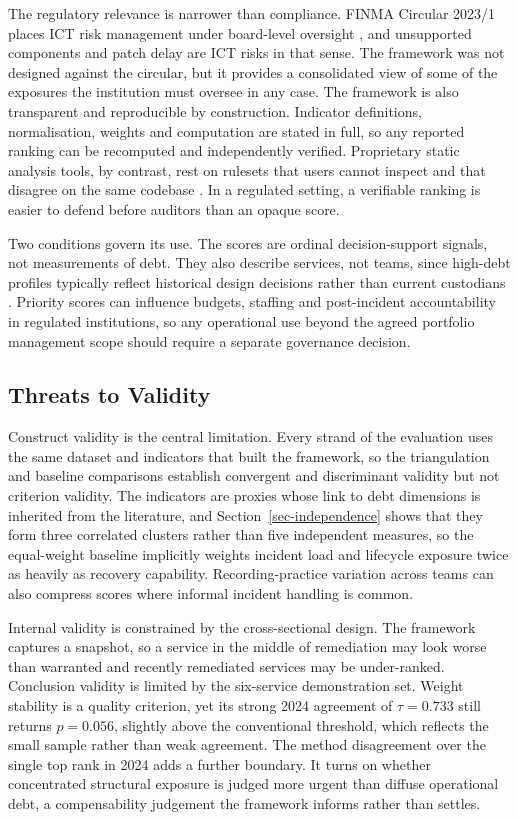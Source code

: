 \documentclass[
  authoryear,
  preprint]{elsarticle}
\begin{document}
The regulatory relevance is narrower than compliance. FINMA Circular
2023/1 places ICT risk management under board-level oversight
\citep{finmaCircular202312024}, and unsupported components and patch
delay are ICT risks in that sense. The framework was not designed
against the circular, but it provides a consolidated view of some of the
exposures the institution must oversee in any case. The framework is
also transparent and reproducible by construction. Indicator
definitions, normalisation, weights and computation are stated in full,
so any reported ranking can be recomputed and independently verified.
Proprietary static analysis tools, by contrast, rest on rulesets that
users cannot inspect and that disagree on the same codebase
\citep{amanatidisEvaluatingAgreementTechnical2020}. In a regulated
setting, a verifiable ranking is easier to defend before auditors than
an opaque score.

Two conditions govern its use. The scores are ordinal decision-support
signals, not measurements of debt. They also describe services, not
teams, since high-debt profiles typically reflect historical design
decisions rather than current custodians
\citep{ahmadTechnicalDebtNot2026}. Priority scores can influence
budgets, staffing and post-incident accountability in regulated
institutions, so any operational use beyond the agreed portfolio
management scope should require a separate governance decision.

\subsection{Threats to Validity}\label{threats-to-validity}

Construct validity is the central limitation. Every strand of the
evaluation uses the same dataset and indicators that built the
framework, so the triangulation and baseline comparisons establish
convergent and discriminant validity but not criterion validity. The
indicators are proxies whose link to debt dimensions is inherited from
the literature, and Section~\ref{sec-independence} shows that they form
three correlated clusters rather than five independent measures, so the
equal-weight baseline implicitly weights incident load and lifecycle
exposure twice as heavily as recovery capability. Recording-practice
variation across teams can also compress scores where informal incident
handling is common.

Internal validity is constrained by the cross-sectional design. The
framework captures a snapshot, so a service in the middle of remediation
may look worse than warranted and recently remediated services may be
under-ranked. Conclusion validity is limited by the six-service
demonstration set. Weight stability is a quality criterion, yet its
strong 2024 agreement of \(\tau = 0.733\) still returns \(p = 0.056\),
slightly above the conventional threshold, which reflects the small
sample rather than weak agreement. The method disagreement over the
single top rank in 2024 adds a further boundary. It turns on whether
concentrated structural exposure is judged more urgent than diffuse
operational debt, a compensability judgement the framework informs
rather than settles.
\end{document}
